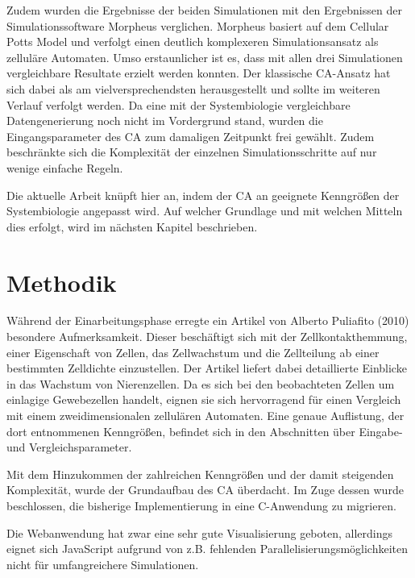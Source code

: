 \documentclass[11pt,a4paper,pointlessnumbers]{scrreprt}  %
\newcommand{\CS}{C\nolinebreak\hspace{-.05em}\raisebox{.6ex}{\scriptsize\bf \#}}
\begin{document}
Zudem wurden die Ergebnisse der beiden Simulationen mit den Ergebnissen der Simulationssoftware Morpheus verglichen. Morpheus basiert auf dem Cellular Potts Model und verfolgt einen deutlich komplexeren Simulationsansatz als zelluläre Automaten. Umso erstaunlicher ist es, dass mit allen drei Simulationen vergleichbare Resultate erzielt werden konnten. Der klassische CA-Ansatz hat sich dabei als am vielversprechendsten herausgestellt und sollte im weiteren Verlauf verfolgt werden. Da eine mit der Systembiologie vergleichbare Datengenerierung noch nicht im Vordergrund stand, wurden die Eingangsparameter des CA zum damaligen Zeitpunkt frei gewählt. Zudem beschränkte sich die Komplexität der einzelnen Simulationsschritte auf nur wenige einfache Regeln.\par
 
Die aktuelle Arbeit knüpft hier an, indem der CA an geeignete Kenngrößen der Systembiologie angepasst wird. Auf welcher Grundlage und mit welchen Mitteln dies erfolgt, wird im nächsten Kapitel beschrieben.

\chapter{Methodik}

Während der Einarbeitungsphase erregte ein Artikel von Alberto Puliafito (2010) \cite{Puliafito} besondere Aufmerksamkeit. Dieser beschäftigt sich mit der Zellkontakthemmung, einer Eigenschaft von Zellen, das Zellwachstum und die Zellteilung ab einer bestimmten Zelldichte einzustellen. Der Artikel liefert dabei detaillierte Einblicke in das Wachstum von Nierenzellen. Da es sich bei den beobachteten Zellen um einlagige Gewebezellen handelt, eignen sie sich hervorragend für einen Vergleich mit einem zweidimensionalen zellulären Automaten. Eine genaue Auflistung, der dort entnommenen Kenngrößen, befindet sich in den Abschnitten über Eingabe- und Vergleichsparameter. \par 

Mit dem Hinzukommen der zahlreichen Kenngrößen und der damit steigenden Komplexität, wurde der Grundaufbau des CA überdacht. Im Zuge dessen wurde beschlossen, die bisherige Implementierung in eine \CS  -Anwendung zu migrieren. \par

Die Webanwendung hat zwar eine sehr gute Visualisierung geboten, allerdings eignet sich JavaScript aufgrund von z.B. fehlenden Parallelisierungsmöglichkeiten nicht für umfangreichere Simulationen. \par
\end{document}

